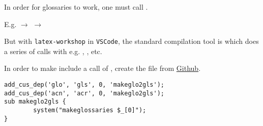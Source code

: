 In order for glossaries to work, one must call .

E.g.   \(\rightarrow\)  \(\rightarrow\) 

But with \texttt{latex-workshop} in \texttt{VSCode}, the standard compilation tool is  which does a series of calls with e.g. , , etc.

In order to make  include a call of , create the file  from \href{https://github.com/robinhellmers/computer_setup}{Github}.

\begin{verbatim}
add_cus_dep('glo', 'gls', 0, 'makeglo2gls');
add_cus_dep('acn', 'acr', 0, 'makeglo2gls');
sub makeglo2gls {
        system("makeglossaries $_[0]");
}
\end{verbatim}